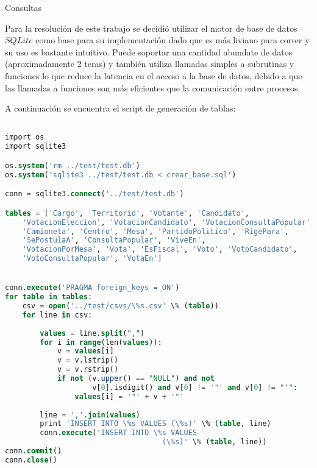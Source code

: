 \begin{section}{Consultas}

Para la resoluci\'on de este trabajo se decidi\'o utilizar el motor de base de datos $SQLite$ como base para su implementaci\'on dado que es m\'as liviano para correr y su uso es bastante intuitivo. Puede soportar una cantidad abundate de datos (aproximadamente 2 teras) y tambi\'en utiliza llamadas simples a subrutinas y funciones lo que reduce la latencia en el acceso a la base de datos, debido a que las llamadas a funciones son más eficientes que la comunicación entre procesos. 

A continuaci\'on se encuentra el script de generaci\'on de tablas:

\begin{lstlisting}[language=SQL]

import os
import sqlite3

os.system('rm ../test/test.db')
os.system('sqlite3 ../test/test.db < crear_base.sql')

conn = sqlite3.connect('../test/test.db')

tables = ['Cargo', 'Territorio', 'Votante', 'Candidato', 
	'VotacionEleccion', 'VotacionCandidato', 'VotacionConsultaPopular', 
	'Camioneta', 'Centro', 'Mesa', 'PartidoPolitico', 'RigePara', 
	'SePostulaA', 'ConsultaPopular', 'ViveEn', 
	'VotacionPorMesa', 'Vota', 'EsFiscal', 'Voto', 'VotoCandidato', 
	'VotoConsultaPopular', 'VotaEn']


conn.execute('PRAGMA foreign_keys = ON')
for table in tables:
	csv = open('../test/csvs/\%s.csv' \% (table))
	for line in csv:
		
		values = line.split(",")		
		for i in range(len(values)):
			v = values[i]			
			v = v.lstrip()
			v = v.rstrip()						
			if not (v.upper() == "NULL") and not 
					v[0].isdigit() and v[0] != '"' and v[0] != "'":
				values[i] = '"' + v + '"'
		
		line = ','.join(values)				
		print 'INSERT INTO \%s VALUES (\%s)' \% (table, line)
		conn.execute('INSERT INTO \%s VALUES 
									(\%s)' \% (table, line))
conn.commit()
conn.close()

\end{lstlisting} 

\end{section}

